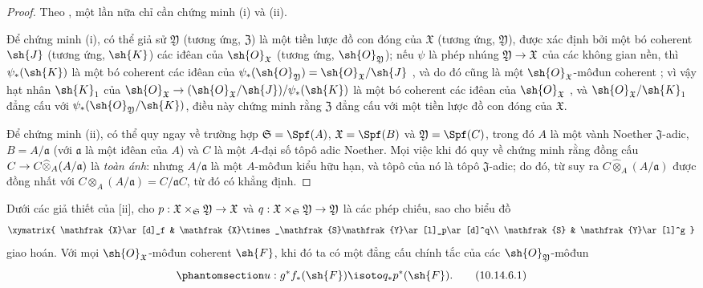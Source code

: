 \documentclass[oneside]{amsart}
\makeatletter
\newcommand{\ega@arrow}[2]{\mathchoice{#1}{#2}{#2}{#2}}
\renewcommand{\to}{\ega@arrow{\longrightarrow}{\rightarrow}}
\let\EGAOriginalLabel\label
\renewcommand{\label}[1]{\phantomsection\EGAOriginalLabel{#1}}
\makeatother
\begin{document}
\begin{proof}
Theo , một lần nữa chỉ cần chứng minh (i) và (ii).

Để chứng minh (i), có thể giả sử $\mathfrak{Y}$ (tương ứng, $\mathfrak{Z}$) là một tiền lược đồ con đóng của $\mathfrak{X}$ (tương ứng, $\mathfrak{Y}$), được xác định bởi một bó coherent $\sh{J}$ (tương ứng, $\sh{K}$) các iđêan của $\sh{O}_\mathfrak{X}$ (tương ứng, $\sh{O}_\mathfrak{Y}$);
nếu $\psi$ là phép nhúng $\mathfrak{Y}\to\mathfrak{X}$ của các không gian nền, thì $\psi_*(\sh{K})$ là một bó coherent các iđêan của $\psi_*(\sh{O}_\mathfrak{Y})=\sh{O}_\mathfrak{X}/\sh{J}$ , và do đó cũng là một $\sh{O}_\mathfrak{X}$-môđun coherent ;
vì vậy hạt nhân $\sh{K}_1$ của $\sh{O}_\mathfrak{X}\to(\sh{O}_\mathfrak{X}/\sh{J})/\psi_*(\sh{K})$ là một bó coherent các iđêan của $\sh{O}_\mathfrak{X}$ , và $\sh{O}_\mathfrak{X}/\sh{K}_1$ đẳng cấu với $\psi_*(\sh{O}_\mathfrak{Y}/\sh{K})$, điều này chứng minh rằng $\mathfrak{Z}$ đẳng cấu với một tiền lược đồ con đóng của $\mathfrak{X}$.

Để chứng minh (ii), có thể quy ngay về trường hợp $\mathfrak{S}=\Spf(A)$, $\mathfrak{X}=\Spf(B)$ và $\mathfrak{Y}=\Spf(C)$, trong đó $A$ là một vành Noether $\mathfrak{J}$-adic, $B=A/\mathfrak{a}$ (với $\mathfrak{a}$ là một iđêan của $A$) và $C$ là một $A$-đại số tôpô adic Noether.
Mọi việc khi đó quy về chứng minh rằng đồng cấu $C\to C\widehat{\otimes}_A(A/\mathfrak{a})$ là \emph{toàn ánh}:
nhưng $A/\mathfrak{a}$ là một $A$-môđun kiểu hữu hạn, và tôpô của nó là tôpô $\mathfrak{J}$-adic;
do đó, từ  suy ra $C\widehat{\otimes}_A(A/\mathfrak{a})$ được đồng nhất với $C\otimes_A(A/\mathfrak{a})=C/\mathfrak{a}C$, từ đó có khẳng định.
\end{proof}

\begin{corollary}[10.14.6]
\label{I.10.14.6}
Dưới các giả thiết của [ii], cho $p:\mathfrak{X}\times_\mathfrak{S}\mathfrak{Y}\to\mathfrak{X}$ và $q:\mathfrak{X}\times_\mathfrak{S}\mathfrak{Y}\to\mathfrak{Y}$ là các phép chiếu, sao cho biểu đồ
\[
  \xymatrix{
    \mathfrak{X}\ar[d]_f &
    \mathfrak{X}\times_\mathfrak{S}\mathfrak{Y}\ar[l]_p\ar[d]^q\\
    \mathfrak{S} &
    \mathfrak{Y}\ar[l]^g
  }
\]
giao hoán.
Với mọi $\sh{O}_\mathfrak{X}$-môđun coherent $\sh{F}$, khi đó ta có một đẳng cấu chính tắc của các $\sh{O}_\mathfrak{Y}$-môđun
\[
\label{I.10.14.6.1}
  u:g^*f_*(\sh{F})\isoto q_*p^*(\sh{F}).
  \tag{10.14.6.1}
\]
\end{corollary}
\end{document}
